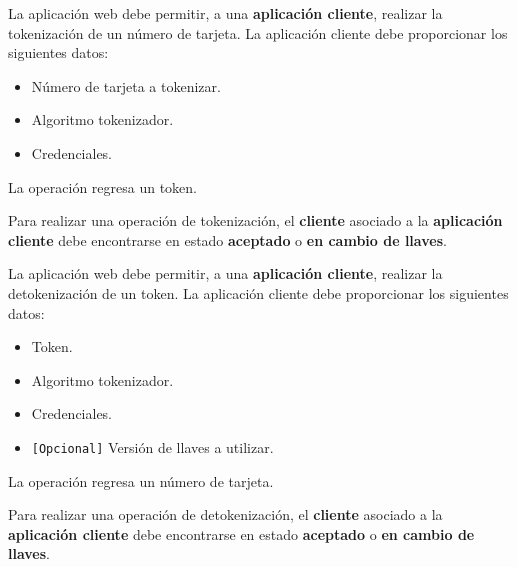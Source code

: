 {
  La aplicación web debe permitir, a una \textbf{aplicación cliente}, realizar
  la tokenización de un número de tarjeta. La aplicación cliente debe
  proporcionar los siguientes datos:
  \begin{itemize}
    \item Número de tarjeta a tokenizar.
    \item Algoritmo tokenizador.
    \item Credenciales.
  \end{itemize}

  \begin{hangparas}{2em}{0}
    La operación regresa un token.

    {
      Para realizar una operación de tokenización, el \textbf{cliente} asociado a
      la \textbf{aplicación cliente} debe encontrarse en estado \textbf{aceptado}
      o \textbf{en cambio de llaves}.
    }
  \end{hangparas}
}

{
  La aplicación web debe permitir, a una \textbf{aplicación cliente}, realizar
  la detokenización de un token. La aplicación cliente debe proporcionar los
  siguientes datos:
  \begin{itemize}
    \item Token.
    \item Algoritmo tokenizador.
    \item Credenciales.
    \item \texttt{[Opcional]} Versión de llaves a utilizar.
  \end{itemize}

  \begin{hangparas}{2em}{0}
    La operación regresa un número de tarjeta.

    {
      Para realizar una operación de detokenización, el \textbf{cliente} asociado
      a la \textbf{aplicación cliente} debe encontrarse en estado
      \textbf{aceptado} o \textbf{en cambio de llaves}.
    }
  \end{hangparas}
}

